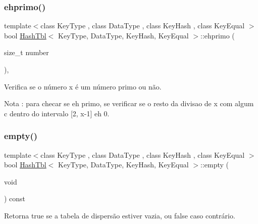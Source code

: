 \subsubsection{\texorpdfstring{ehprimo()}{ehprimo()}}
{\footnotesize\ttfamily template$<$class Key\+Type , class Data\+Type , class Key\+Hash , class Key\+Equal $>$ \\
bool \hyperlink{classHashTbl}{Hash\+Tbl}$<$ Key\+Type, Data\+Type, Key\+Hash, Key\+Equal $>$\+::ehprimo (\begin{DoxyParamCaption}\item[{size\+\_\+t}]{number }\end{DoxyParamCaption})\hspace{0.3cm}{\ttfamily [inline]}, {\ttfamily [private]}}



Verifica se o número x é um número primo ou não. 

\begin{DoxyNote}{Nota}
\+: para checar se eh primo, se verificar se o resto da divisao de x com algum c dentro do intervalo \mbox{[}2, x-\/1\mbox{]} eh 0. 
\end{DoxyNote}
\mbox{\label{classHashTbl_af0a640cbc448ffc7a874ec3ce2a28bd2}} 
\subsubsection{\texorpdfstring{empty()}{empty()}}
{\footnotesize\ttfamily template$<$class Key\+Type , class Data\+Type , class Key\+Hash , class Key\+Equal $>$ \\
bool \hyperlink{classHashTbl}{Hash\+Tbl}$<$ Key\+Type, Data\+Type, Key\+Hash, Key\+Equal $>$\+::empty (\begin{DoxyParamCaption}\item[{void}]{ }\end{DoxyParamCaption}) const\hspace{0.3cm}{\ttfamily [inline]}}



Retorna true se a tabela de dispersão estiver vazia, ou false caso contrário. 

\mbox{\label{classHashTbl_a5abe7dd52a783fbfa005bcfbb6fdea3e}} 
